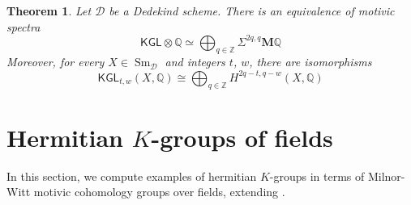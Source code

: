 \documentclass[11pt,hyp,english]{article}
\newcommand{\Z}{\mathbb{Z}}
\newcommand{\Q}{\mathbb{Q}}
\newcommand{\KGL}{\mathsf{KGL}}
\newcommand{\HQ}{\mathbf{M}\Q}
\newcommand{\Sm}{\operatorname{Sm}}
\newcommand{\tensor}{\otimes}
\newtheorem{theorem}{Theorem}[section]
\theoremstyle{definition}
\begin{document}
\begin{theorem}
\label{theorem:eoosplittingkgl}
Let $\mathcal{D}$ be a Dedekind scheme. 
There is an equivalence of motivic spectra
$$
\KGL\tensor\Q
\simeq
\bigoplus_{q\in\Z}\Sigma^{2q,q}\HQ
$$
Moreover, for every $X\in \Sm_{\mathcal{D}}$ and integers $t$, $w$, there are isomorphisms
\[
\KGL_{t,w}(X,\Q) 
\cong 
\bigoplus_{q\in\Z} H^{2q-t,q-w}(X,\Q)
\]
\end{theorem}




\section{Hermitian $K$-groups of fields}
\label{section:ldf}

In this section, we compute examples of hermitian $K$-groups in terms of Milnor-Witt motivic 
cohomology groups over fields, extending . 
\end{document}
